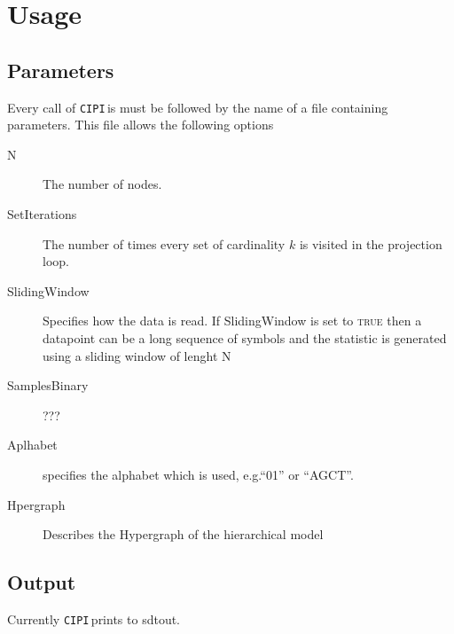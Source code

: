 \documentclass[12pt]{amsart}
\newcommand{\eg}{e.g.\;}  %
\newcommand{\cipi}{\texttt{CIPI}\,}
\theoremstyle{plain}%
\theoremstyle{definition}
\theoremstyle{remark}
\begin{document}
\section{Usage}
\label{sec:usage}
\subsection{Parameters}
Every call of \cipi is must be followed by the name of a file containing
parameters. This file allows the following options
\begin{description}
  \item[N] The number of nodes.
  \item[SetIterations] The number of times every set of cardinality $k$ is
    visited in the projection loop.
  \item[SlidingWindow] Specifies how the data is read. If SlidingWindow is set
    to \textsc{true} then a datapoint can be a long sequence of symbols and the
    statistic is generated using a sliding window of lenght N
  \item[SamplesBinary] ???
  \item[Aplhabet] specifies the alphabet which is used, \eg ``01'' or
    ``AGCT''. 
  \item[Hpergraph] Describes the Hypergraph of the hierarchical model
\end{description}

\subsection{Output}
Currently \cipi prints to sdtout.



\end{document}
